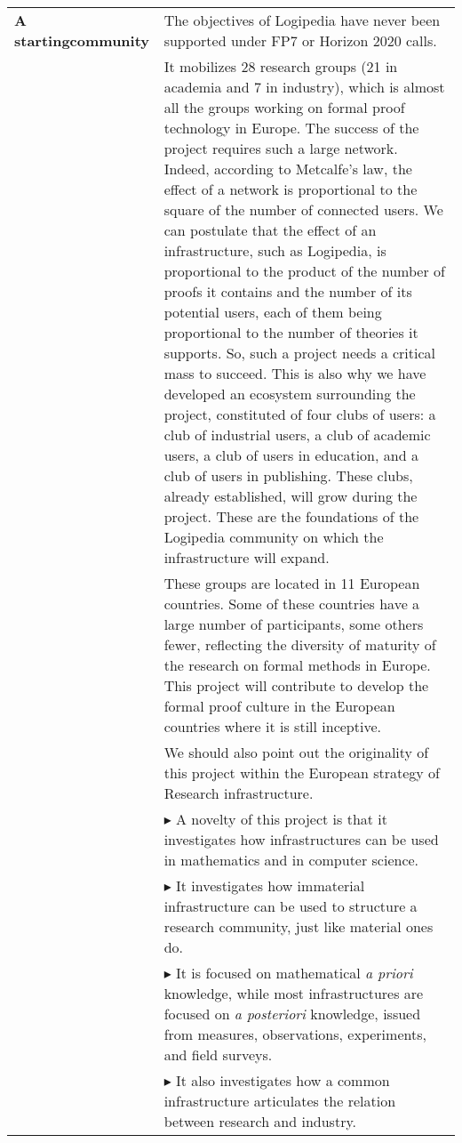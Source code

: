 \begin{longtable}{|p{}|p{}|}
{\bf A starting\newline community} & The objectives of Logipedia have never
been supported under FP7 or Horizon 2020 calls.\\
& \hspace{0.4cm} It mobilizes 28 research groups (21 in academia and 7
in industry), which is almost all the groups working on formal proof
technology in Europe.  The success of the project requires such a
large network.  Indeed, according to Metcalfe's law, the effect of a
network is proportional to the square of the number of connected
users. We can postulate that the effect of an infrastructure, such as
Logipedia, is proportional to the product of the number of proofs it
contains and the number of its potential users, each of them being
proportional to the number of theories it supports. So, such a project
needs a critical mass to succeed. This is also why we have developed an
ecosystem surrounding the project, constituted of four clubs of users:
a club of industrial users, a club of academic users, a club of users
in education, and a club of users in publishing.
These clubs, already established, will grow during the project.  These
are the foundations of the Logipedia community on which the
infrastructure will expand.\\
& \hspace{0.4cm} These groups are located in 11 European countries.
Some of these countries have a large number of participants, some
others fewer, reflecting the diversity of maturity of the research on
formal methods in Europe. This project will contribute to develop the
formal proof
culture in the European countries where it is still inceptive.\\
& \hspace{0.4cm} We should also point out the originality of this
project within the
European strategy of Research infrastructure.\\
& $\blacktriangleright$ A novelty of this project is that it
investigates how infrastructures can be used in mathematics and in
computer science.\\
& $\blacktriangleright$ It investigates how immaterial infrastructure
can be used to structure a research community, just like material ones
do.\\
& $\blacktriangleright$ It is focused on mathematical {\em a priori}
knowledge, while most infrastructures are focused on {\em a
  posteriori} knowledge, issued from measures, observations,
experiments, and field surveys.\\
& $\blacktriangleright$ It also investigates how a common
infrastructure articulates the relation between research and industry.
\\
\hline


\end{longtable}
